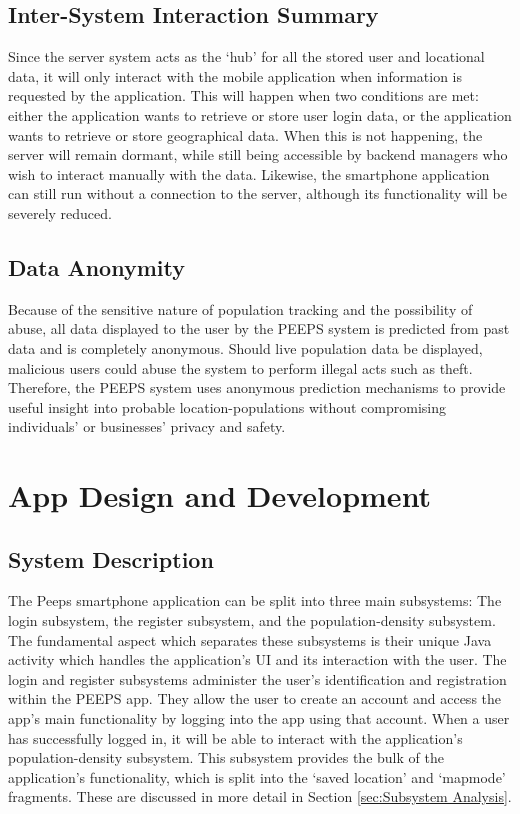 \subsection{Inter-System Interaction Summary}
\label{sec:Inter-System Interaction Summary}
Since the server system acts as the `hub' for all the stored user and locational data, it will only interact with the mobile application when information is requested by the application. This will happen when two conditions are met: either the application wants to retrieve or store user login data, or the application wants to retrieve or store geographical data. When this is not happening, the server will remain dormant, while still being accessible by backend managers who wish to interact manually with the data. Likewise, the smartphone application can still run without a connection to the server, although its functionality will be severely reduced. 

\subsection{Data Anonymity}
Because of the sensitive nature of population tracking and the possibility of abuse, all data displayed to the user by the PEEPS system is predicted from past data and is completely anonymous. Should live population data be displayed, malicious users could abuse the system to perform illegal acts such as theft. Therefore, the PEEPS system uses anonymous prediction mechanisms to provide useful insight into probable location-populations without compromising individuals' or businesses' privacy and safety. 

\section{App Design and Development}
\subsection{System Description}
The Peeps smartphone application can be split into three main subsystems: The login subsystem, the register subsystem, and the population-density subsystem. The fundamental aspect which separates these subsystems is their unique Java activity which handles the application's UI and its interaction with the user.  The login and register subsystems administer the user's identification and registration within the PEEPS app. They allow the user to create an account and access the app's main functionality by logging into the app using that account. When a user has successfully logged in, it will be able to interact with the application's population-density subsystem. This subsystem provides the bulk of the application's functionality, which is split into the `saved location' and `mapmode' fragments. These are discussed in more detail in Section \ref{sec:Subsystem Analysis}.

